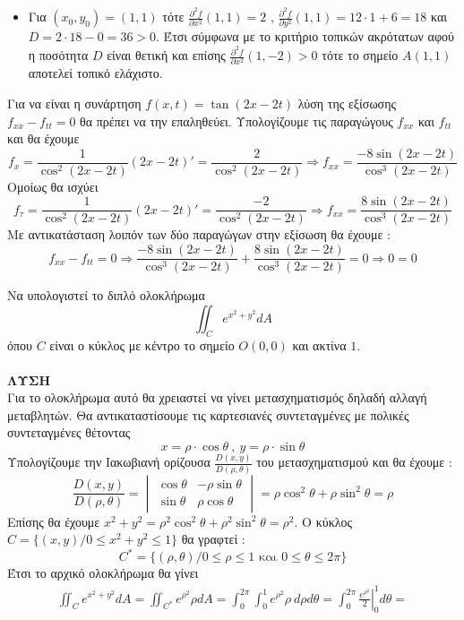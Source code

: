 \documentclass[internet]{diag-xelatex}
\newcommand{\lysh}{\textbf{\textcolor{\xrwma}{ΛΥΣΗ}}}
\begin{document}
\begin{thema}[start=2]
\begin{rlist}[leftmargin=4mm]
\begin{itemize}
\item Για $ (x_0,y_0)=(1,1) $ τότε $ \frac{\partial^2f}{\partial x^2}(1,1)=2 $ , $ \frac{\partial^2f}{\partial y^2}(1,1)=12\cdot1+6=18 $ και $ D=2\cdot18-0=36>0 $. Έτσι σύμφωνα με το κριτήριο τοπικών ακρότατων αφού η ποσότητα $ D $ είναι θετική και επίσης $ \frac{\partial^2f}{\partial x^2}(1,-2)>0 $ τότε το σημείο $ A(1,1) $ αποτελεί τοπικό ελάχιστο.
\end{itemize} 
\item Για να είναι η συνάρτηση $ f(x,t)=\tan(2x-2t) $ λύση της εξίσωσης $ f_{xx}-f_{tt}=0 $ θα πρέπει να την επαληθεύει. Υπολογίζουμε τις παραγώγους $ f_{xx}$ και $f_{tt} $ και θα έχουμε
\[ f_x=\frac{1}{\cos^2(2x-2t)}(2x-2t)'=\frac{2}{\cos^2(2x-2t)}\Rightarrow f_{xx}=\frac{-8\sin{(2x-2t)}}{\cos^3(2x-2t)} \]
Ομοίως θα ισχύει 
\[ f_τ=\frac{1}{\cos^2(2x-2t)}(2x-2t)'=\frac{-2}{\cos^2(2x-2t)}\Rightarrow f_{xx}=\frac{8\sin{(2x-2t)}}{\cos^3(2x-2t)} \]
Με αντικατάσταση λοιπόν των δύο παραγώγων στην εξίσωση θα έχουμε :
\[ f_{xx}-f_{tt}=0\Rightarrow \frac{-8\sin{(2x-2t)}}{\cos^3(2x-2t)}+\frac{8\sin{(2x-2t)}}{\cos^3(2x-2t)}=0\Rightarrow 0=0 \]
\end{rlist}
\newpage
\item Να υπολογιστεί το διπλό ολοκλήρωμα
\[ \iint_C{e^{x^2+y^2}dA} \]
όπου $ C $ είναι ο κύκλος με κέντρο το σημείο $ O(0,0) $ και ακτίνα $ 1 $.\\\\
\lysh\\
Για το ολοκλήρωμα αυτό θα χρειαστεί να γίνει μετασχηματισμός δηλαδή αλλαγή μεταβλητών. Θα αντικαταστίσουμε τις καρτεσιανές συντεταγμένες με πολικές συντεταγμένες θέτοντας \[ x=\rho\cdot\cos{\theta}\ ,\ y=\rho\cdot\sin{\theta} \]
Υπολογίζουμε την Ιακωβιανή ορίζουσα $ \frac{D(x,y)}{D(\rho,\theta)} $ του μετασχηματισμού και θα έχουμε :
\[ \frac{D(x,y)}{D(\rho,\theta)}=\begin{vmatrix}
\cos{\theta} & -\rho\sin{\theta}\\
\sin{\theta} & \rho\cos{\theta}
\end{vmatrix}=\rho\cos^2{\theta}+\rho\sin^2{\theta}=\rho \]
Επίσης θα έχουμε $ x^2+y^2=\rho^2\cos^2{\theta}+\rho^2\sin^2{\theta}=\rho^2 $. Ο κύκλος $ C=\{(x,y)/0\leq x^2+y^2\leq 1\} $ θα γραφτεί :
\[ C^{*}=\{(\rho,\theta)/0\leq \rho\leq 1\textrm{ και } 0\leq\theta\leq 2\pi\} \]
Έτσι το αρχικό ολοκλήρωμα θα γίνει
\begin{gather*}
\iint_C{e^{x^2+y^2}dA}=\iint_{C^{*}}{e^{\rho^2}\rho dA}=\int_{0}^{2\pi}{\int_{0}^{1}{e^{\rho^2}\rho\  d\rho}d\theta}=\int_{0}^{2\pi}{\left.\frac{e^{\rho^2}}{2} \right|_{0}^{1} d\theta}=\\

\end{gather*}
\end{thema}
\end{document}
